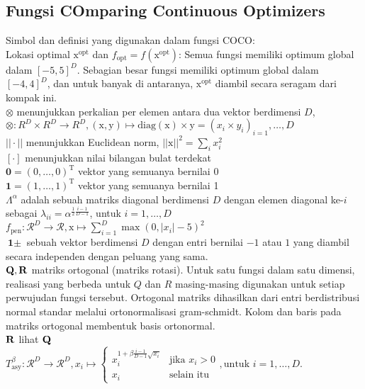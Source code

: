 \subsection{Fungsi COmparing Continuous Optimizers}
Simbol dan definisi yang digunakan dalam fungsi COCO:\\
Lokasi optimal $\mathrm{x}^{\text{opt}}$ dan $f_{\text{opt}} = f(\mathrm{x}^{\text{opt}})$: Semua fungsi memiliki optimum global dalam $[-5, 5]^D$. Sebagian besar fungsi memiliki optimum global dalam $[-4, 4]^D$, dan untuk banyak di antaranya, $\mathrm{x}^{\text{opt}}$ diambil secara seragam dari kompak ini.\\
\noindent$\otimes$ menunjukkan perkalian per elemen antara dua vektor berdimensi $D$, $\otimes:R^D\times R^D\to R^D, (\mathrm{x},\mathrm{y})\mapsto \text{diag}(\mathrm{x})\times\mathrm{y}=(x_i\times y_i)_{i=1},\ldots,D$\\
$||\cdot||$ menunjukkan Euclidean norm, $||\mathrm{x}||^2=\sum_{i}x^2_i$\\
$\left[\cdot\right]$ menunjukkan nilai bilangan bulat terdekat\\
$\textbf{0}=(0,\ldots,0)^{\mathrm{T}}$ vektor yang semuanya bernilai 0\\
$\textbf{1}=(1,\ldots,1)^{\mathrm{T}}$ vektor yang semuanya bernilai 1\\
$\Lambda^{\alpha}$ adalah sebuah matriks diagonal berdimensi $D$ dengan elemen diagonal ke-$i$ sebagai $\lambda_{ii}=\alpha^{\frac{1}{2}\frac{i-1}{D-1}}$, untuk $i=1,\ldots,D$\\
$f_{\text{pen}}:\mathcal{R}^D\to \mathcal{R}, \mathrm{x}\mapsto\sum_{i=1}^{D}\max(0,\left|x_i\right|-5)^2$\\
$\textbf{1}\pm$ sebuah vektor berdimensi $D$ dengan entri bernilai $-1$ atau $1$ yang diambil secara independen dengan peluang yang sama.\\
$\bf{Q, R}$ matriks ortogonal (matriks rotasi). Untuk satu fungsi dalam satu dimensi, realisasi yang berbeda untuk $Q$ dan $R$ masing-masing digunakan untuk setiap perwujudan fungsi tersebut. Ortogonal matriks dihasilkan dari entri berdistribusi normal standar melalui ortonormalisasi gram-schmidt. Kolom dan baris pada matriks ortogonal membentuk basis ortonormal.\\
$\bf{R}$ lihat $\bf{Q}$\\
$T_{\text{asy}}^{\beta}:\mathcal{R}^D\to \mathcal{R}^D,x_i\mapsto \begin{cases}
  x_i^{1+\beta\frac{i-1}{D-1}\sqrt{x_i}} & \text{jika } x_i > 0\\
  x_i & \text{selain itu}
\end{cases}, \text{untuk } i=1,\ldots,D$.\\
